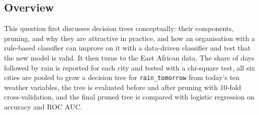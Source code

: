 \documentclass[conference]{IEEEtran}
\begin{document}
\subsection{Overview}
This question first discusses decision trees conceptually: their components, pruning, and why they are attractive in practice, and how an organisation with a rule-based classifier can improve on it with a data-driven classifier and test that the new model is valid. It then turns to the East African data. The share of days followed by rain is reported for each city and tested with a chi-square test, all six cities are pooled to grow a decision tree for \texttt{rain\_tomorrow} from today's ten weather variables, the tree is evaluated before and after pruning with 10-fold cross-validation, and the final pruned tree is compared with logistic regression on accuracy and ROC AUC.
\end{document}
